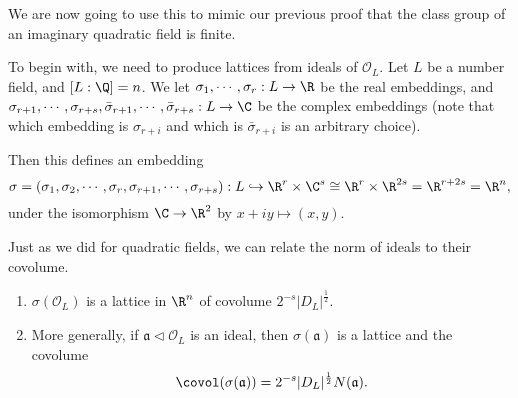 \documentclass[a4paper]{article}
\begin{document}
We are now going to use this to mimic our previous proof that the class group of an imaginary quadratic field is finite.

To begin with, we need to produce lattices from ideals of $\mathcal{O}_L$. Let $L$ be a number field, and $[L:\Q] = n$. We let $\sigma_1, \cdots,\sigma_r: L \to \R$ be the real embeddings, and $\sigma_{r + 1}, \cdots, \sigma_{r + s},\bar{\sigma}_{r + 1}, \cdots, \bar{\sigma}_{r + s}: L \to \C$ be the complex embeddings (note that which embedding is $\sigma_{r + i}$ and which is $\bar{\sigma}_{r + i}$ is an arbitrary choice).

Then this defines an embedding
\[
  \sigma = (\sigma_1, \sigma_2, \cdots, \sigma_r, \sigma_{r + 1}, \cdots, \sigma_{r + s}): L \hookrightarrow \R^r \times \C^s \cong \R^r \times \R^{2s} = \R^{r + 2s} = \R^n,
\]
under the isomorphism $\C \to \R^2$ by $x + iy \mapsto (x, y)$.

Just as we did for quadratic fields, we can relate the norm of ideals to their covolume.

\begin{lemma}\leavevmode
  \begin{enumerate}
    \item $\sigma(\mathcal{O}_L)$ is a lattice in $\R^n$ of covolume $2^{-s} |D_L|^{\frac{1}{2}}$.
    \item More generally, if $\mathfrak{a} \lhd \mathcal{O}_L$ is an ideal, then $\sigma(\mathfrak{a})$ is a lattice and the covolume
      \[
        \covol(\sigma(\mathfrak{a})) = 2^{-s} |D_L|^{\frac{1}{2}} N(\mathfrak{a}).
      \]
  \end{enumerate}
\end{lemma}
\end{document}
